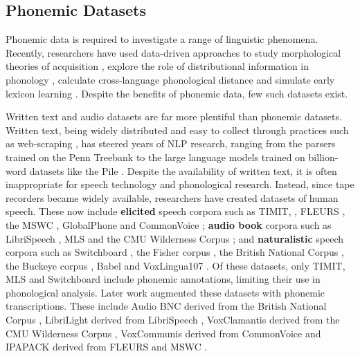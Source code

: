 \subsection{Phonemic Datasets}\label{sec:13-phonemicdatasets}


Phonemic data is required to investigate a range of linguistic phenomena. Recently, researchers have used data-driven approaches to study morphological theories of acquisition \citep{kirov2018recurrent}, explore the role of distributional information in phonology \citep{mayer-2020-phonology-distribution}, calculate cross-language phonological distance \citep{eden-2018-phonological-distance} and simulate early lexicon learning \citep{goriely2023word}. Despite the benefits of phonemic data, few such datasets exist.

Written text and audio datasets are far more plentiful than phonemic datasets. Written text, being widely distributed and easy to collect through practices such as web-scraping \citep{bansal-2022-datascaling}, has steered years of NLP research, ranging from the parsers trained on the Penn Treebank \citep{taylor2003penn} to the large language models trained on billion-word datasets like the Pile \citep{pile}. Despite the availability of written text, it is often inappropriate for speech technology and phonological research. Instead, since tape recorders became widely available, researchers have created datasets of human speech. These now include \textbf{elicited} speech corpora such as TIMIT, \citep{garofolo1993darpa}, FLEURS \citep{conneau2023fleurs}, the MSWC \citep{mazumder2021multilingual}, GlobalPhone \citep{schultz2002globalphone} and CommonVoice \citep{ardila-etal-2020-common}; \textbf{audio book} corpora such as LibriSpeech \citep{panayotov2015librispeech}, MLS \citep{pratap2020mls} and the CMU Wilderness Corpus \citep{8683536}; and \textbf{naturalistic} speech corpora such as Switchboard \citep{godfrey1992switchboard}, the Fisher corpus \citep{cieri2004fisher}, the British National Corpus \citep{bnc2007}, the Buckeye corpus \citep{pitt2007buckeye}, Babel \citep{harper2011babel} and VoxLingua107 \citep{9383459}. Of these datasets, only TIMIT, MLS and Switchboard include phonemic annotations, limiting their use in phonological analysis. Later work augmented these datasets with phonemic transcriptions. These include Audio BNC derived from the British National Corpus \citep{coleman2011mining}, LibriLight derived from LibriSpeech \citep{Kahn_2020}, VoxClamantis derived from the CMU Wilderness Corpus \citep{salesky-etal-2020-corpus}, VoxCommunis derived from CommonVoice \citep{ahn-chodroff-2022-voxcommunis} and IPAPACK derived from FLEURS and MSWC \citep{zhu-etal-2024-taste}.

